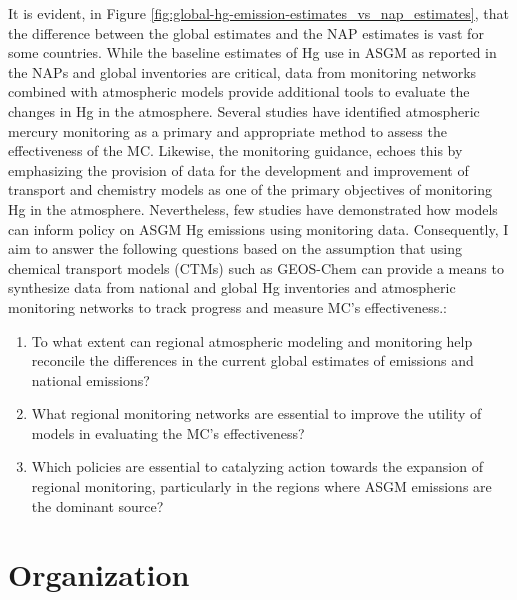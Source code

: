 \begin{flushleft}
 It is evident, in Figure \ref{fig:global-hg-emission-estimates_vs_nap_estimates}, that the difference between the global estimates and the NAP estimates is vast for some countries. While the baseline estimates of Hg use in ASGM as reported in the NAPs and global inventories are critical, data from monitoring networks combined with atmospheric models provide additional tools to evaluate the changes in Hg in the atmosphere. Several studies have identified atmospheric mercury monitoring as a primary and appropriate method to assess the effectiveness of the MC\cite{sprovieri_atmospheric_2016,evers_evaluating_2016,gustin_measuring_2015,united_nations_environment_programme_technical_2019}. Likewise, the monitoring guidance,\cite{unep_guidance_2021} echoes this by emphasizing the provision of data for the development and improvement of transport and chemistry models as one of the primary objectives of monitoring Hg in the atmosphere. Nevertheless, few studies have demonstrated how models can inform policy on ASGM Hg emissions using monitoring data. Consequently, I aim to answer the following questions based on the assumption that using chemical transport models (CTMs) such as GEOS-Chem can provide a means to synthesize data from national and global Hg inventories and atmospheric monitoring networks to track progress and measure MC's effectiveness.:
\begin{enumerate}
  \item To what extent can regional atmospheric modeling and monitoring help reconcile the differences in the current global estimates of emissions and national emissions?
  \item What regional monitoring networks are essential to improve the utility of models in evaluating the MC's effectiveness?
  \item Which policies are essential to catalyzing action towards the expansion of regional monitoring, particularly in the regions where ASGM emissions are the dominant source?
\end{enumerate}
\end{flushleft}




 
\section{Organization}
 
